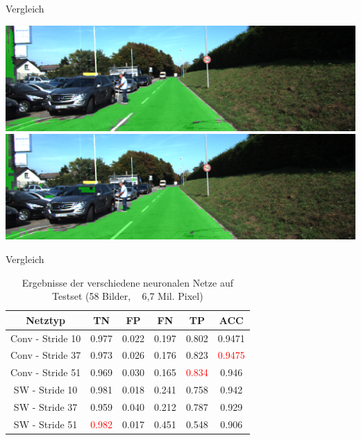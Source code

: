 \begin{frame}{Vergleich}
  \begin{center}
      \includegraphics[scale=0.24]{../images/Convolutional/um_000014-overlay-fully-49-patch.png}
         \vspace{0.1cm}
    \includegraphics[scale=0.24]{../images/Convolutional/um_000014-overlay.png}
    \end{center}
\end{frame}

\begin{frame}{Vergleich}

      
      \begin{table}[h!]
  \begin{center}
    \label{tab:table1}
    \begin{tabular}{c||c|c|c|c|c}
      Netztyp & TN & FP & FN & TP & ACC\\
      \hline
      \hline
      Conv - Stride 10 & 0.977 & 0.022 & 0.197 & 0.802 & 0.9471\\
      Conv - Stride 37 & 0.973 & 0.026 & 0.176 & 0.823 &  \textcolor{red}{0.9475}\\ 
      Conv - Stride 51 & 0.969 & 0.030 & 0.165 & \textcolor{red}{0.834} & 0.946\\
      \hline
      SW - Stride 10 & 0.981 & 0.018 & 0.241 & 0.758 & 0.942\\
      SW - Stride 37 & 0.959 & 0.040 & 0.212 & 0.787 & 0.929\\
      SW - Stride 51 & \textcolor{red}{0.982} & 0.017 & 0.451 & 0.548 & 0.906\\
    \end{tabular}
    \caption{Ergebnisse der verschiedene neuronalen Netze auf Testset (58 Bilder, ~ 6,7 Mil. Pixel)}
  \end{center}
\end{table}

\end{frame}


